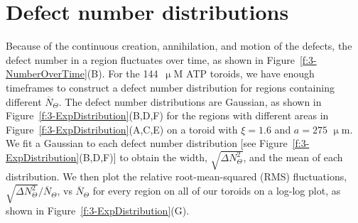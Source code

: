 \section{Defect number distributions}
Because of the continuous creation, annihilation, and motion of the defects, the defect number in a region fluctuates over time, as shown in Figure~\ref{f:3-NumberOverTime}(B).
For the 144~$\upmu$M ATP toroids, we have enough timeframes to construct a defect number distribution for regions containing different $\overbar{N}_{\Theta}$.
The defect number distributions are Gaussian, as shown in Figure~\ref{f:3-ExpDistribution}(B,D,F) for the regions with different areas in Figure~\ref{f:3-ExpDistribution}(A,C,E) on a toroid with $\xi = 1.6$ and $a = 275$ $\upmu$m.
We fit a Gaussian to each defect number distribution [see Figure~\ref{f:3-ExpDistribution}(B,D,F)] to obtain the width, $\displaystyle{\sqrt{\Delta N_{\Theta}^2}}$, and the mean of each distribution.
We then plot the relative root-mean-squared (RMS) fluctuations, $\displaystyle{\sqrt{\Delta N_{\Theta}^2}} \bigg / \displaystyle {\overbar{N}_{\Theta}}$, vs $\overbar{N}_{\Theta}$ for every region on all of our toroids on a log-log plot, as shown in Figure~\ref{f:3-ExpDistribution}(G).

